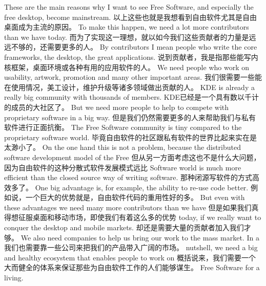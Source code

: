 These are the main reasons why I want to see Free Software, and especially the free desktop, become mainstream.
以上这些也就是我想看到自由软件尤其是自由桌面成为主流的原因。
 To make this happen, we need a lot more contributors than we have today.
而为了实现这一理想，就以如今我们这些贡献者的力量是远远不够的，还需要更多的人。
 By contributors I mean people who write the core frameworks, the desktop, the great applications.
说到贡献者，我是指那些能写内核框架，桌面环境或各种有用的应用软件的人。
 We need people who work on usability, artwork, promotion and many other important areas. 
 我们很需要一些能在使用情况，美工设计，维护升级等诸多领域做出贡献的人。
 KDE is already a really big community with thousands of members.
 KDE已经是一个具有数以千计的成员的大社区了。
  But we need more people to help to compete with proprietary software in a big way.
但是我们仍然需要更多的人来帮助我们与私有软件进行正面抗衡。
 The Free Software community is tiny compared to the proprietary software world.
 毕竟自由软件的社区跟私有软件的世界比起来实在是太渺小了。
 On the one hand this is not a problem, because the distributed software development model of the Free
但从另一方面考虑这也不是什么大问题，因为自由软件的这种分散式软件发展模式远比
Software world is much more efficient than the closed source way of writing software.
那种闭源写软件的方式高效多了。
 One big advantage is, for example, the ability to re-use code better.
例如说，一个巨大的优势就是，自由软件代码的重用性好的多。
But even with these advantages we need many more contributors than we have
但是如果我们真得想征服桌面和移动市场，即使我们有着这么多的优势
today, if we really want to conquer the desktop and mobile markets.
却还是需要大量的贡献者加入我们才够。
We also need companies to help us bring our work to the mass market. In a
我们也需要靠一些公司来把我们的产品带入广阔的市场。
nutshell, we need a big and healthy ecosystem that enables people to work on
概括说来，我们需要一个大而健全的体系来保证那些为自由软件工作的人们能够谋生。
Free Software for a living.

